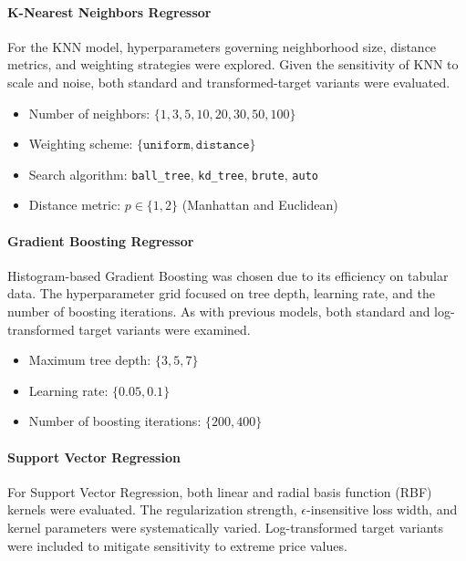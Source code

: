 \documentclass[11pt]{article}
\begin{document}
				\paragraph{K-Nearest Neighbors Regressor}
				\noindent
				For the KNN model, hyperparameters governing neighborhood size, distance metrics, and weighting strategies were explored.
				Given the sensitivity of KNN to scale and noise, both standard and transformed-target variants were evaluated.

				\begin{itemize}
					\item Number of neighbors: $\{1, 3, 5, 10, 20, 30, 50, 100\}$
					\item Weighting scheme: $\{\texttt{uniform}, \texttt{distance}\}$
					\item Search algorithm: \texttt{ball\_tree}, \texttt{kd\_tree}, \texttt{brute}, \texttt{auto}
					\item Distance metric: $p \in \{1, 2\}$ (Manhattan and Euclidean)
				\end{itemize}

				\paragraph{Gradient Boosting Regressor}
				\noindent
				Histogram-based Gradient Boosting was chosen due to its efficiency on tabular data.
				The hyperparameter grid focused on tree depth, learning rate, and the number of boosting iterations.
				As with previous models, both standard and log-transformed target variants were examined.

				\begin{itemize}
					\item Maximum tree depth: $\{3, 5, 7\}$
					\item Learning rate: $\{0.05, 0.1\}$
					\item Number of boosting iterations: $\{200, 400\}$
				\end{itemize}

				\paragraph{Support Vector Regression}
				\noindent
				For Support Vector Regression, both linear and radial basis function (RBF) kernels were evaluated.
				The regularization strength, $\epsilon$-insensitive loss width, and kernel parameters were systematically varied.
				Log-transformed target variants were included to mitigate sensitivity to extreme price values.
\end{document}
